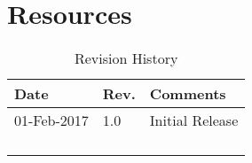 \chapter{Resources}

\begin{longtable}[]{@{}lll@{}}
\toprule
Date & Rev. & Comments\tabularnewline
\midrule
\endhead
01-Feb-2017 & 1.0 & Initial Release\tabularnewline
& &\tabularnewline
& &\tabularnewline
& &\tabularnewline
\bottomrule
\caption{Revision History}
\end{longtable}